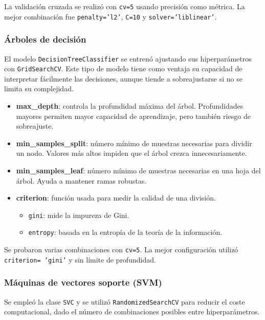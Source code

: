 La validación cruzada se realizó con \texttt{cv=5} usando precisión como métrica. La mejor combinación fue \texttt{penalty='l2'}, \texttt{C=10} y \texttt{solver='liblinear'}.

\subsubsection{Árboles de decisión}

El modelo \texttt{DecisionTreeClassifier} se entrenó ajustando sus hiperparámetros con \texttt{GridSearchCV}. Este tipo de modelo tiene como ventaja su capacidad de interpretar fácilmente las decisiones, aunque tiende a sobreajustarse si no se limita su complejidad.

\begin{itemize}
    \item \textbf{max\_depth}: controla la profundidad máxima del árbol. Profundidades mayores permiten mayor capacidad de aprendizaje, pero también riesgo de sobreajuste.
    \item \textbf{min\_samples\_split}: número mínimo de muestras necesarias para dividir un nodo. Valores más altos impiden que el árbol crezca innecesariamente.
    \item \textbf{min\_samples\_leaf}: número mínimo de muestras necesarias en una hoja del árbol. Ayuda a mantener ramas robustas.
    \item \textbf{criterion}: función usada para medir la calidad de una división.
    \begin{itemize}
        \item \texttt{gini}: mide la impureza de Gini.
        \item \texttt{entropy}: basada en la entropía de la teoría de la información.
    \end{itemize}
\end{itemize}

Se probaron varias combinaciones con \texttt{cv=5}. La mejor configuración utilizó \texttt{criterion= 'gini'} y sin límite de profundidad.

\subsubsection{Máquinas de vectores soporte (SVM)}

Se empleó la clase \texttt{SVC} y se utilizó \texttt{RandomizedSearchCV} para reducir el coste computacional, dado el número de combinaciones posibles entre hiperparámetros.

